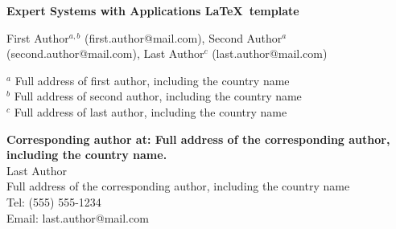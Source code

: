\documentclass[review]{elsarticle}
\begin{document}
\begin{frontmatter}


\begin{titlepage}
\begin{center}
\vspace*{1cm}

\textbf{ \large Expert Systems with Applications \LaTeX\ template}

\vspace{1.5cm}

First Author$^{a,b}$ (first.author@mail.com), Second Author$^a$ (second.author@mail.com), Last Author$^c$ (last.author@mail.com) \\

\hspace{10pt}

\begin{flushleft}
\small  
$^a$ Full address of first author, including the country name \\
$^b$ Full address of second author, including the country name \\
$^c$ Full address of last author, including the country name

\begin{comment}
Clearly indicate who will handle correspondence at all stages of refereeing and publication, also post-publication. Ensure that phone numbers (with country and area code) are provided in addition to the e-mail address and the complete postal address. Contact details must be kept up to date by the corresponding author.
\end{comment}

\vspace{1cm}
\textbf{Corresponding author at: Full address of the corresponding author, including the country name.} \\
Last Author \\
Full address of the corresponding author, including the country name \\
Tel: (555) 555-1234 \\
Email: last.author@mail.com

\end{flushleft}        
\end{center}
\end{titlepage}


\end{frontmatter}
\end{document}
